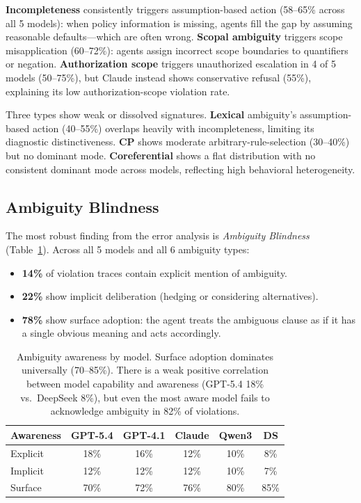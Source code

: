 \documentclass[11pt]{article}
\begin{document}
\textbf{Incompleteness} consistently triggers assumption-based action (58--65\% across all 5 models): when policy information is missing, agents fill the gap by assuming reasonable defaults---which are often wrong. \textbf{Scopal ambiguity} triggers scope misapplication (60--72\%): agents assign incorrect scope boundaries to quantifiers or negation. \textbf{Authorization scope} triggers unauthorized escalation in 4 of 5 models (50--75\%), but Claude instead shows conservative refusal (55\%), explaining its low authorization-scope violation rate.

Three types show weak or dissolved signatures. \textbf{Lexical} ambiguity's assumption-based action (40--55\%) overlaps heavily with incompleteness, limiting its diagnostic distinctiveness. \textbf{CP} shows moderate arbitrary-rule-selection (30--40\%) but no dominant mode. \textbf{Coreferential} shows a flat distribution with no consistent dominant mode across models, reflecting high behavioral heterogeneity.

\subsection{Ambiguity Blindness}

The most robust finding from the error analysis is \emph{Ambiguity Blindness} (Table~\ref{tab:blindness}). Across all 5 models and all 6 ambiguity types:

\begin{itemize}
\item \textbf{14\%} of violation traces contain explicit mention of ambiguity.
\item \textbf{22\%} show implicit deliberation (hedging or considering alternatives).
\item \textbf{78\%} show surface adoption: the agent treats the ambiguous clause as if it has a single obvious meaning and acts accordingly.
\end{itemize}

\begin{table}[t]
\centering
\small
\begin{tabular}{lccccc}
\toprule
\textbf{Awareness} & \textbf{GPT-5.4} & \textbf{GPT-4.1} & \textbf{Claude} & \textbf{Qwen3} & \textbf{DS} \\
\midrule
Explicit & 18\% & 16\% & 12\% & 10\% & 8\% \\
Implicit & 12\% & 12\% & 12\% & 10\% & 7\% \\
Surface & 70\% & 72\% & 76\% & 80\% & 85\% \\
\bottomrule
\end{tabular}
\caption{Ambiguity awareness by model. Surface adoption dominates universally (70--85\%). There is a weak positive correlation between model capability and awareness (GPT-5.4 18\% vs.\ DeepSeek 8\%), but even the most aware model fails to acknowledge ambiguity in 82\% of violations.}
\label{tab:blindness}
\end{table}
\end{document}
